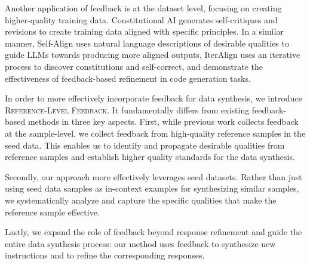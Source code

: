 Another application of feedback is at the dataset level, focusing on creating higher-quality training data. Constitutional AI \citep{bai2022constitutionalaiharmlessnessai} generates self-critiques and revisions to create training data aligned with specific principles. In a similar manner, Self-Align \citep{NEURIPS2023_0764db11} uses natural language descriptions of desirable qualities to guide LLMs towards producing more aligned outputs, IterAlign \citep{chen2024iteralign} uses an iterative process to discover constitutions and self-correct, and \citet{chen2024learning} demonstrate the effectiveness of feedback-based refinement in code generation tasks.

In order to more effectively incorporate feedback for data synthesis, we introduce \textsc{Reference-Level Feedback}. It fundamentally differs from existing feedback-based methods in three key aspects. First, while previous work collects feedback at the sample-level, we collect feedback from high-quality reference samples in the seed data. This enables us to identify and propagate desirable qualities from reference samples and establish higher quality standards for the data synthesis.

Secondly, our approach more effectively leverages seed datasets. Rather than just using seed data samples as in-context examples for synthesizing similar samples, we systematically analyze and capture the specific qualities that make the reference sample effective.

Lastly, we expand the role of feedback beyond response refinement and guide the entire data synthesis process: our method uses feedback to synthesize new instructions and to refine the corresponding responses.